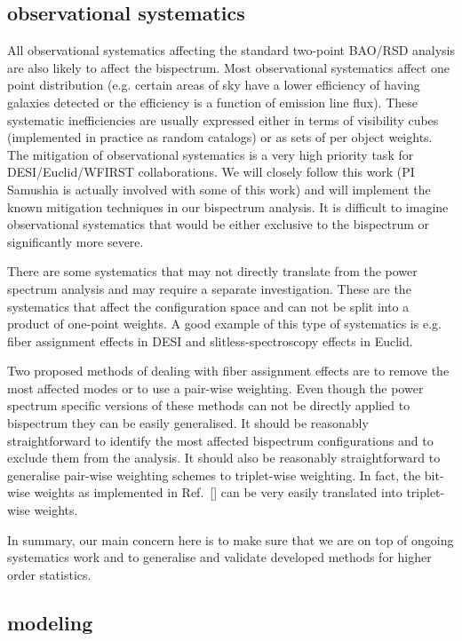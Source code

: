 \subsection*{observational systematics}

All observational systematics affecting the standard two-point BAO/RSD analysis
are also likely to affect the bispectrum. Most observational systematics affect
one point distribution (e.g. certain areas of sky have a lower efficiency of
having galaxies detected or the efficiency is a function of emission line
flux). These systematic inefficiencies are usually expressed either in terms of
visibility cubes (implemented in practice as random catalogs) or as sets of
per object weights. The mitigation of observational systematics is a very high
priority task for DESI/Euclid/WFIRST collaborations. We will closely follow
this work (PI Samushia is actually involved with some of this work) and will
implement the known mitigation techniques in our bispectrum analysis. It is
difficult to imagine observational systematics that would be either exclusive
to the bispectrum or significantly more severe.

There are some systematics that may not directly translate from the power
spectrum analysis and may require a separate investigation. These are the
systematics that affect the configuration space and can not be split into a
product of one-point weights. A good example of this type of systematics is
e.g. fiber assignment effects in DESI and slitless-spectroscopy effects in
Euclid.

Two proposed methods of dealing with fiber assignment effects are to remove the
most affected modes or to use a pair-wise weighting. Even though the power
spectrum specific versions of these methods can not be directly applied to
bispectrum they can be easily generalised. It should be reasonably
straightforward to identify the most affected bispectrum configurations and to
exclude them from the analysis. It should also be reasonably straightforward
to generalise pair-wise weighting schemes to triplet-wise weighting. In fact,
the bit-wise weights as implemented in Ref.~[] can be very easily translated
into triplet-wise weights.

In summary, our main concern here is to make sure that we are on top of ongoing
systematics work and to generalise and validate developed methods for higher
order statistics.

\subsection*{modeling}

